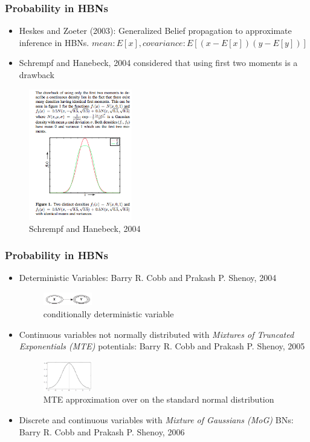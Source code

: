 \documentclass{beamer}
\begin{document}
\begin{frame}
	   \frametitle{Probability in HBNs}
	\begin{itemize}
	  \item Heskes and Zoeter (2003): Generalized Belief propagation to approximate inference in HBNs. $ mean: E[x], covariance: E[(x-E[x])(y-E[y])]$
	 \item Schrempf and Hanebeck, 2004 considered that using  first two moments is a drawback
  	\end{itemize} 
		\begin{figure}
		  	\centering
    			\includegraphics[width=0.4\textwidth]{HBM-2004.png}
  			\caption{Schrempf and Hanebeck, 2004}
		\end{figure}
\end{frame}

\begin{frame}
	   \frametitle{Probability in HBNs }
	   \begin{itemize}
	  	\item Deterministic Variables: Barry R. Cobb and Prakash P. Shenoy, 2004
		\begin{figure}
		  	\centering
    			\includegraphics[width=0.2\textwidth]{deterministic.png}
  			\caption{conditionally deterministic variable}
		\end{figure}
	 	\item Continuous variables not normally distributed with \textit{Mixtures of Truncated Exponentials (MTE)} potentials: Barry R. Cobb and Prakash P. Shenoy, 2005
		\begin{figure}
		  	\centering
    			\includegraphics[width=0.2\textwidth]{mte.png}
  			\caption{MTE approximation over on the standard normal distribution}
		\end{figure}
		\item Discrete and continuous variables with \textit{Mixture of Gaussians (MoG)} BNs: Barry R. Cobb and Prakash P. Shenoy, 2006
  	\end{itemize} 	
\end{frame}
\end{document}
